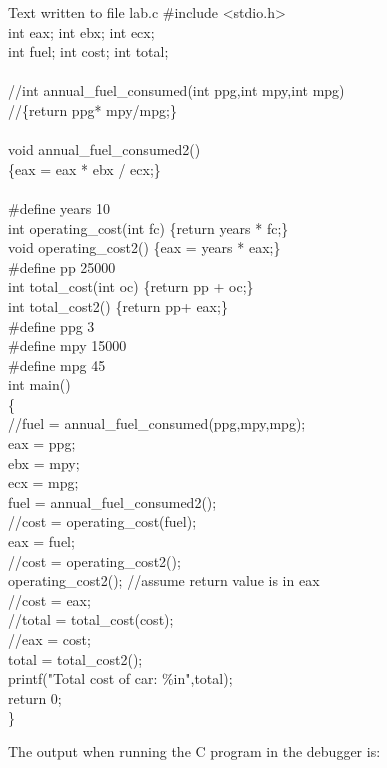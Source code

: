 \documentclass{article}
\begin{document}
\begin{GFT}{Text written to file lab.c}
\+\#include <stdio.h>\\
\+int eax; int ebx; int ecx;\\
\+int fuel; int cost; int total;\\
\+\\
\+//int annual\_fuel\_consumed(int ppg,int mpy,int mpg)\\
\+//\{return ppg* mpy/mpg;\}\\
\+\\
\+void annual\_fuel\_consumed2()\\
\+\{eax = eax * ebx / ecx;\}\\
\+\\
\+\#define years 10\\
\+int operating\_cost(int fc) \{return years * fc;\}\\
\+void operating\_cost2() \{eax = years * eax;\}\\
\+\#define pp 25000\\
\+int total\_cost(int oc) \{return pp + oc;\}\\
\+int total\_cost2() \{return pp+ eax;\}\\
\+\#define ppg 3\\
\+\#define mpy 15000\\
\+\#define mpg 45\\
\+int main()\\
\+\{\\
\+	//fuel = annual\_fuel\_consumed(ppg,mpy,mpg);\\
\+	eax = ppg;\\
\+	ebx = mpy;\\
\+	ecx = mpg;\\
\+	fuel = annual\_fuel\_consumed2();\\
\+	//cost = operating\_cost(fuel);\\
\+	eax = fuel;\\
\+	//cost = operating\_cost2();\\
\+	operating\_cost2(); //assume return value is in eax\\
\+	//cost = eax;\\
\+	//total = total\_cost(cost);\\
\+	//eax = cost;\\
\+	total = total\_cost2();\\
\+	printf("Total cost of car: \%i\Backslash{}n",total);\\
\+	return 0;\\
\+\}\\
\end{GFT}
The output when running the C program in the debugger is: 
\end{document}

